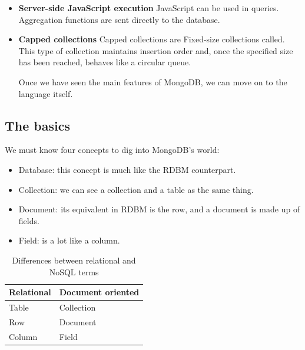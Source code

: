 \begin{itemize}
\item \textbf{Server-side JavaScript execution} 
JavaScript can be used in queries. Aggregation functions are sent directly to the database.

\item \textbf{Capped collections} 
Capped collections are Fixed-size collections called. This type of collection maintains insertion order and, once the specified size has been reached, behaves like a circular queue.

Once we have seen the main features of MongoDB, we can move on to the language itself.
\end{itemize}


\subsection{The basics}

We must know four concepts to dig into MongoDB's world:

\begin{itemize}
\item Database: this concept is much like the RDBM counterpart.
\item Collection: we can see a collection and a table as the same thing.
\item Document: its equivalent in RDBM is the row, and a document is made up of fields.
\item Field: is a lot like a column.
\end{itemize}


\begin{table}
\begin{center}
\begin{tabular}{|l|l|}
\hline
\textbf{Relational} & \textbf{Document oriented} \\ 
\hline
Table & Collection\\
\hline
Row & Document\\
\hline
Column & Field \\
\hline
\end{tabular}
\end{center}
\caption{Differences between relational and NoSQL terms}
\end{table}





